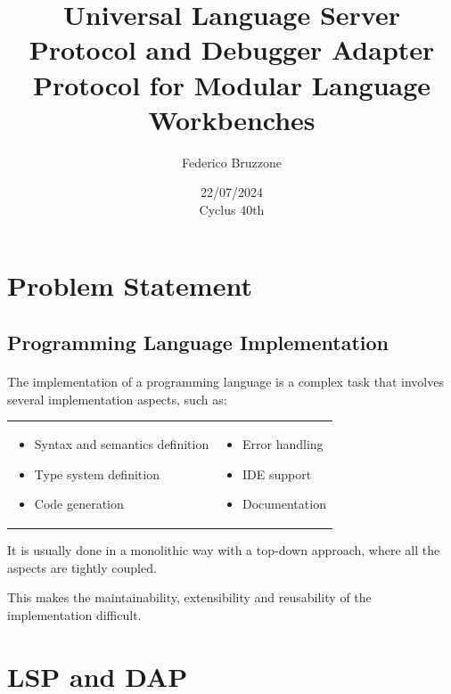 \documentclass[9pt,xcolor=table,svgnames]{beamer}
\title[Universal LSP and DAP for Modular LWs]{Universal Language Server Protocol and Debugger Adapter Protocol for Modular Language Workbenches}
\author[Federico Bruzzone]
{
    \vspace{-10pt}Federico Bruzzone
}
\institute{\small
	Universit\`a degli Studi di Milano\\
	Computer Science Department\\
    PhD Candidate in Computer Science\\
}
\date{\scriptsize{22/07/2024\\Cyclus 40th}}
\begin{document}
\begin{frame}
	\titlepage
\end{frame}

\section{Problem Statement}

\subsection[ ]{Programming Language Implementation}
\begin{frame}{\secname}
    \framesubtitle{\subsecname}
    The implementation of a programming language is a complex task that involves several implementation aspects, such as:

    \begin{tabular}{p{} p{}}
        \begin{itemize}
            \item Syntax and semantics definition
            \item \alert{Type system definition}
            \item Code generation
        \end{itemize}
        &
        \begin{itemize}
            \item Error handling
            \item \alert{IDE support}
            \item Documentation
        \end{itemize}
    \end{tabular}

    \pause

    It is usually done in a \alert{monolithic} way with a \alert{top-down} approach, where all the aspects are tightly coupled.

    \pause
    \bigskip

    \normalsize This makes the \alert{maintainability}, \alert{extensibility} and \alert{reusability} of the implementation difficult.
\end{frame}


\section[LSP \& DAP]{LSP and DAP}
\end{document}
